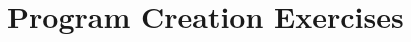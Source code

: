 


\clearpage
\section{Program Creation Exercises} %
\label{sec:program_creation_exercises}




% 

